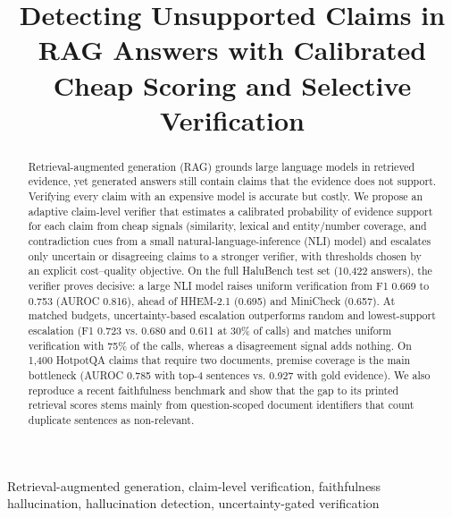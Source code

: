 \documentclass[conference]{IEEEtran}
\begin{document}
\title{Detecting Unsupported Claims in RAG Answers with Calibrated Cheap Scoring and Selective Verification}

\author{
}

\maketitle

\begin{abstract}
Retrieval-augmented generation (RAG) grounds large language models in retrieved evidence, yet generated answers still contain claims that the evidence does not support. Verifying every claim with an expensive model is accurate but costly. We propose an adaptive claim-level verifier that estimates a calibrated probability of evidence support for each claim from cheap signals (similarity, lexical and entity/number coverage, and contradiction cues from a small natural-language-inference (NLI) model) and escalates only uncertain or disagreeing claims to a stronger verifier, with thresholds chosen by an explicit cost--quality objective. On the full HaluBench test set (10,422 answers), the verifier proves decisive: a large NLI model raises uniform verification from F1 0.669 to 0.753 (AUROC 0.816), ahead of HHEM-2.1 (0.695) and MiniCheck (0.657). At matched budgets, uncertainty-based escalation outperforms random and lowest-support escalation (F1 0.723 vs. 0.680 and 0.611 at 30\% of calls) and matches uniform verification with 75\% of the calls, whereas a disagreement signal adds nothing. On 1,400 HotpotQA claims that require two documents, premise coverage is the main bottleneck (AUROC 0.785 with top-4 sentences vs. 0.927 with gold evidence). We also reproduce a recent faithfulness benchmark and show that the gap to its printed retrieval scores stems mainly from question-scoped document identifiers that count duplicate sentences as non-relevant.
\end{abstract}

\begin{IEEEkeywords}
Retrieval-augmented generation, claim-level verification, faithfulness hallucination, hallucination detection, uncertainty-gated verification
\end{IEEEkeywords}
\end{document}
